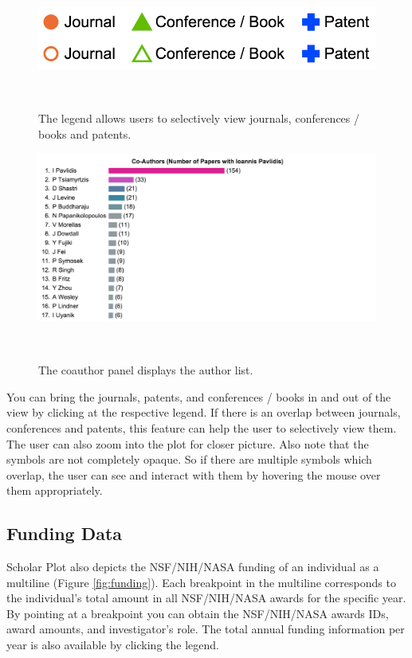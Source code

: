 \begin{figure}[!htb]
\centering
  \includegraphics[width=1\textwidth]{figures/fig_legend-toggle}
  \caption{The legend allows users to selectively view journals, conferences / books and patents.}~\label{fig-legend}
\end{figure}



\begin{figure}
    \centering
    \includegraphics[width=1\textwidth]{figures/fig-panel-coauthros.png}
    \caption{The coauthor panel displays the author list.}~\label{fig-coauthors}
\end{figure}




You can bring the journals, patents, and conferences / books in and out of the view by clicking at the respective legend. If there is an overlap between journals, conferences and patents, this feature can help the user to selectively view them. The user can also zoom into the plot for closer picture. Also note that the symbols are not completely opaque. So if there are multiple symbols which overlap, the user can see and interact with them by hovering the mouse over them appropriately.

\subsection{Funding Data}
Scholar Plot also depicts the NSF/NIH/NASA funding of an individual as a multiline (Figure \ref{fig:funding}). Each breakpoint in the multiline corresponds to the individual's total amount in all NSF/NIH/NASA awards for the specific year. By pointing at a breakpoint you can obtain the NSF/NIH/NASA awards IDs, award amounts, and investigator's role. The total annual funding information per year is also available by clicking the legend.


